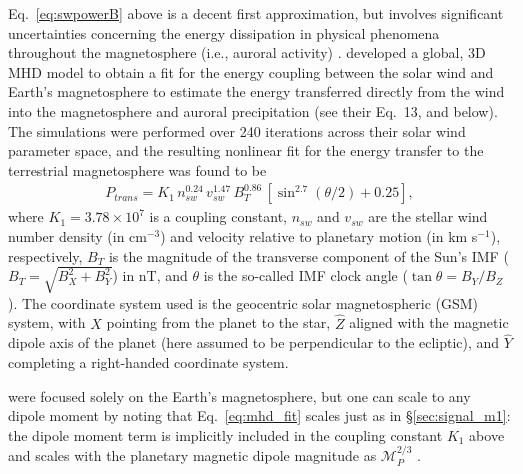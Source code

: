 \documentclass{emulateapj}
\newcommand{\XXX}[1]{#1}      %
\newcommand{\xxx}[1]{{\color{red} #1}} %
\begin{document}
\XXX{Eq.~\ref{eq:swpowerB} above is a decent first approximation, but involves significant uncertainties concerning the energy dissipation in physical phenomena throughout the magnetosphere (i.e., auroral activity) \citep{Perreault1978,Akasofu1981}. \citet{Wang2014} developed a global, 3D MHD model to obtain a fit for the energy coupling between the solar wind and Earth's magnetosphere to estimate the energy transferred directly from the wind into the magnetosphere and auroral precipitation (see their Eq.~13, and below). The simulations were performed over 240 iterations across their solar wind parameter space, and the resulting nonlinear fit for the energy transfer to the terrestrial magnetosphere was found to be}
%
\begin{align}
    P_{trans} = K_1\,n_{sw}^{0.24}\,v_{sw}^{1.47}\,B_T^{0.86}\,\left[\sin^{2.7}(\theta/2)+0.25 \right] \label{eq:mhd_fit},
\end{align}
\XXX{where $K_1=3.78\times 10^7$ is a coupling constant, $n_{sw}$ and $v_{sw}$ are the stellar wind number density (in cm$^{-3}$) and velocity relative to planetary motion (in km s$^{-1}$), respectively, $B_T$ is the magnitude of the transverse component of the Sun's IMF ($B_T = \sqrt{B_X^2+B_Y^2}$) in nT, and $\theta$ is the so-called IMF clock angle ($\tan\theta = B_Y/B_Z $). The coordinate system used is the geocentric solar magnetospheric (GSM) system, with $\hat{X}$ pointing from the planet to the star, $\hat{Z}$ aligned with the magnetic dipole axis of the planet (here assumed to be perpendicular to the ecliptic), and $\hat{Y}$ completing a right-handed coordinate system.}

\XXX{\citet{Wang2014} were focused solely on the Earth's magnetosphere, but one can scale to any dipole moment by noting that Eq.~\ref{eq:mhd_fit} scales just as in \S\ref{sec:signal_m1}: the dipole moment term is implicitly included in the coupling constant $K_1$ above and scales with the planetary magnetic dipole magnitude as $\mathcal{M}_P^{2/3}$ \citep[][also Eqs.~\ref{eq:swpower} \& \ref{eq:pressbal} above]{Vasyliunas1982}.}

 
\end{document}
